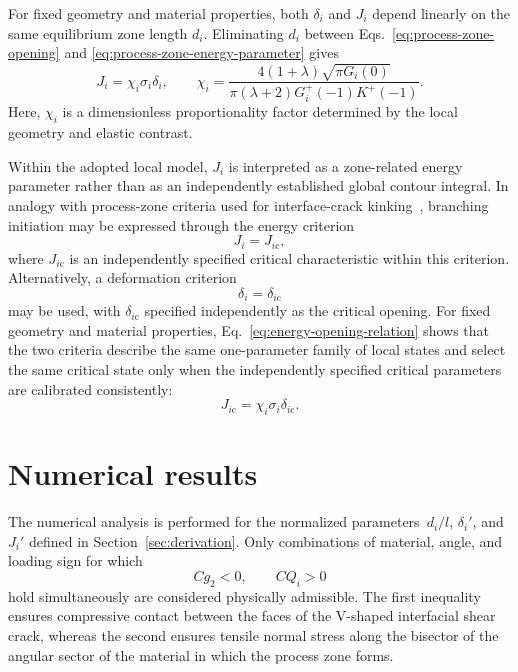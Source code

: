 \documentclass[pdflatex,iicol,sn-mathphys-ay]{sn-jnl}
\begin{document}
For fixed geometry and material properties, both $\delta_i$ and $J_i$
depend linearly on the same equilibrium zone length $d_i$. Eliminating
$d_i$ between Eqs.~\eqref{eq:process-zone-opening} and
\eqref{eq:process-zone-energy-parameter} gives
\begin{equation}
\label{eq:energy-opening-relation}
  J_i=\chi_i\sigma_i\delta_i,
  \qquad
  \chi_i=
  \frac{4(1+\lambda)\sqrt{\pi G_i(0)}}
  {\pi(\lambda+2)G_i^+(-1)K^+(-1)}.
\end{equation}
Here, $\chi_i$ is a dimensionless proportionality factor determined by
the local geometry and elastic contrast.

Within the adopted local model, $J_i$ is interpreted as a zone-related
energy parameter rather than as an independently established global contour
integral. In analogy with process-zone criteria used for interface-crack
kinking~\citep{KaminskyEtAl2023}, branching initiation may be expressed
through the energy criterion
\begin{equation*}
  J_i=J_{i\mathrm{c}},
\end{equation*}
where $J_{i\mathrm{c}}$ is an independently specified critical
characteristic within this criterion. Alternatively, a deformation criterion
\begin{equation*}
  \delta_i=\delta_{i\mathrm{c}}
\end{equation*}
may be used, with $\delta_{i\mathrm{c}}$ specified independently as the
critical opening. For fixed geometry and material properties,
Eq.~\eqref{eq:energy-opening-relation} shows that the two criteria
describe the same one-parameter family of local states and select the
same critical state only when the independently specified critical
parameters are calibrated consistently:
\begin{equation*}
  J_{i\mathrm{c}}
  =\chi_i\sigma_i\delta_{i\mathrm{c}}.
\end{equation*}


\section{Numerical results}
\label{sec:numerical-results}

The numerical analysis is performed for the normalized parameters
$\,d_i/l$, $\delta_i'$, and $J_i'$ defined in
Section~\ref{sec:derivation}. Only combinations of material, angle, and
loading sign for which
\begin{equation*}
  Cg_2<0,\qquad CQ_i>0
\end{equation*}
hold simultaneously are considered physically admissible. The first
inequality ensures compressive contact between the faces of the V-shaped
interfacial shear crack, whereas the second ensures tensile normal stress
along the bisector of the angular sector of the material in which the
process zone forms.
\end{document}
